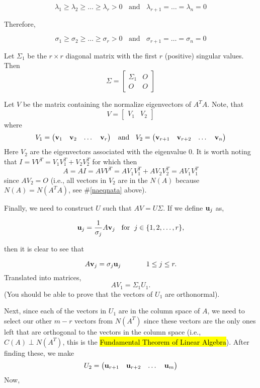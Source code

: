 \begin{questions}
\[ \lambda_1\ge  \lambda_2 \ge  \dots \ge  \lambda_r >  0 \;\; \text{ and } \;\;  \lambda_{r+1} = \dots = \lambda_n = 0  \]

Therefore, 

\[ \sigma_1\ge  \sigma_2 \ge  \dots \ge  \sigma_r >  0 \;\; \text{ and } \;\;  \sigma_{r+1} = \dots = \sigma_n = 0  \]

Let $\Sigma_1$ be the $r \times r$ diagonal matrix with the first $r$ (positive) singular values.  Then
\[  \Sigma = \begin{bmatrix} \Sigma_1 & O \\ O & O \end{bmatrix} \] 

Let $V$ be the matrix containing the normalize eigenvectors of $A^TA$.   Note, that  
\[ V =  \begin{bmatrix} V_1 &  V_2  \end{bmatrix}  \] where  
\[ V_1 =  \begin{pmatrix} {\bf v}_1 &  {\bf v}_2 &  \dots  &  {\bf v}_r  \end{pmatrix}   \;\; \text{ and } \;\; V_2 =  \begin{pmatrix} {\bf v}_{r+1} &  {\bf v}_{r+2} &  \dots  &  {\bf v}_n  \end{pmatrix}  \]  
Here $V_2$ are the eigenvectors associated with the eigenvalue $0$.  It is worth noting that $I = VV^T = V_1V_1^T+V_2 V_2^T$ for which then 
\[ A = AI = AVV^T = AV_1V_1^T+A V_2 V_2^T  = AV_1V_1^T \]
since $AV_2 = O$ (i.e., all vectors in $V_2$ are in the $N(A)$ because $N(A) = N(A^TA)$, see \#\ref{naeqnata} above).    



Finally, we need to construct $U$ such that $AV = U \Sigma$.  If we define ${\bf u}_j$ as,  

\[  {\bf u}_j = \frac{1}{\sigma_j} A {\bf v}_j    \;\;  \text{ for }\;  j \in \{1, 2, \dots, r \}, \]

then it is clear to see that 


\[   A {\bf v}_j =  {\sigma_j} {\bf u}_j   \;\; \;\; \;\;\;\;\;\;\;\; \; 1 \le j \le r.  \]
Translated into matrices, 
\[   A V_1 = \Sigma_1 U_1 .  \]
 (You should be able to prove that the vectors of $U_1$ are orthonormal).  
 
 
Next, since each of the vectors in $U_1$ are in the column space of $A$, we need to select our other $m-r$ vectors from $N(A^T)$ since these vectors are the only ones left that are orthogonal to the vectors in the column space (i.e., $C(A) \perp N(A^T)$, this is the \hl{Fundamental Theorem of Linear Algebra}).  After finding these, we make
\[  U_2 =  \begin{pmatrix} {\bf u}_{r+1} &  {\bf u}_{r+2} & \dots & {\bf u}_{m}  \end{pmatrix}  \]
Now, 


\end{questions}
